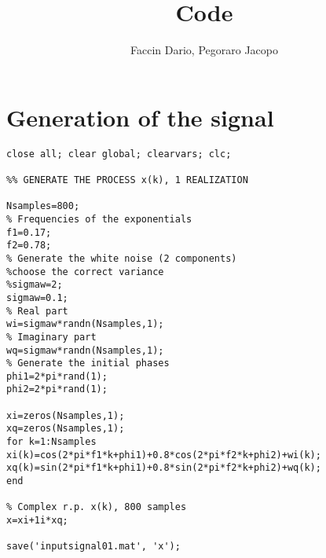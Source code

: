 \documentclass[a4paper,10pt]{article}
\title{Code}
\author{Faccin Dario, Pegoraro Jacopo}
\date{}
\begin{document}
\maketitle

\section{Generation of the signal}
\begin{verbatim}
close all; clear global; clearvars; clc;

%% GENERATE THE PROCESS x(k), 1 REALIZATION

Nsamples=800;
% Frequencies of the exponentials
f1=0.17;
f2=0.78;
% Generate the white noise (2 components)
%choose the correct variance
%sigmaw=2;
sigmaw=0.1;
% Real part
wi=sigmaw*randn(Nsamples,1);
% Imaginary part
wq=sigmaw*randn(Nsamples,1);
% Generate the initial phases
phi1=2*pi*rand(1);
phi2=2*pi*rand(1);

xi=zeros(Nsamples,1);
xq=zeros(Nsamples,1);
for k=1:Nsamples
xi(k)=cos(2*pi*f1*k+phi1)+0.8*cos(2*pi*f2*k+phi2)+wi(k);
xq(k)=sin(2*pi*f1*k+phi1)+0.8*sin(2*pi*f2*k+phi2)+wq(k);
end

% Complex r.p. x(k), 800 samples
x=xi+1i*xq;

save('inputsignal01.mat', 'x');
\end{verbatim}
\end{document}
